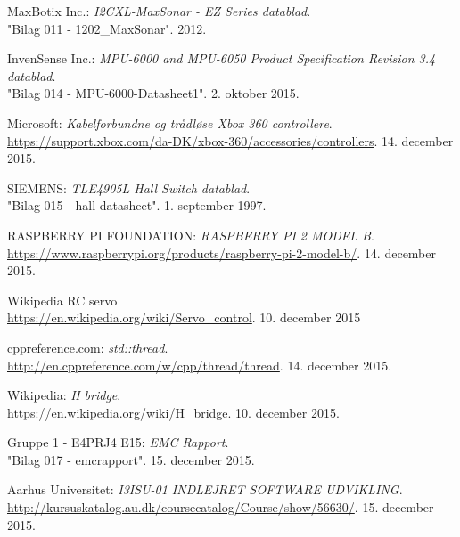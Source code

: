 \begin{thebibliography}{2}
 MaxBotix Inc.: \textit{I2CXL-MaxSonar - EZ Series datablad}. \\
"Bilag 011 - 1202\_MaxSonar". 2012.

 InvenSense Inc.: \textit{MPU-6000 and MPU-6050 Product Specification Revision 3.4 datablad}. \\
"Bilag 014 - MPU-6000-Datasheet1". 2. oktober 2015.

 Microsoft: \textit{Kabelforbundne og trådløse Xbox 360 controllere}. \\
\url{https://support.xbox.com/da-DK/xbox-360/accessories/controllers}. 14. december 2015.

 SIEMENS: \textit{TLE4905L Hall Switch datablad}. \\
"Bilag 015 - hall datasheet". 1. september 1997.

 RASPBERRY PI FOUNDATION: \textit{RASPBERRY PI 2 MODEL B}. \\
\url{https://www.raspberrypi.org/products/raspberry-pi-2-model-b/}. 14. december 2015.

 Wikipedia RC servo \\
\url{https://en.wikipedia.org/wiki/Servo_control}. 10. december 2015

 cppreference.com: \textit{std::thread}. \\
\url{http://en.cppreference.com/w/cpp/thread/thread}. 14. december 2015.

 Wikipedia: \textit{H bridge}.\\
\url{https://en.wikipedia.org/wiki/H_bridge}. 10. december 2015.

 Gruppe 1 - E4PRJ4 E15: \textit{EMC Rapport}.\\
"Bilag 017 - emcrapport". 15. december 2015.

 Aarhus Universitet: \textit{I3ISU-01 INDLEJRET SOFTWARE UDVIKLING}. \\
\url{http://kursuskatalog.au.dk/coursecatalog/Course/show/56630/}. 15. december 2015.

\end{thebibliography}
